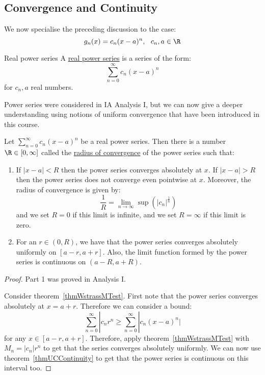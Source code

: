 \documentclass[../Main.tex]{subfiles}
\begin{document}
\subsection{Convergence and Continuity}
We now specialise the preceding discussion to the case:
\begin{equation*}
    g_n(x) = c_n (x - a)^n,~~ c_n, a \in \R
\end{equation*}
\begin{definition}{Real power series}
    A \underline{real power series} is a series of the form:
    \begin{equation*}
        \sum_{n=0}^{\infty} c_n (x-a)^n
    \end{equation*}
    for $c_n, a$ real numbers.
\end{definition}
Power series were considered in IA Analysis I, but we can now give a deeper understanding using notions of uniform convergence that have been introduced in this course.
\begin{theorem}
    Let $\sum_{n = 0}^\infty c_n (x-a)^n$ be a real power series. Then there is a number $\R \in [0, \infty]$ called the \underline{radius of convergence} of the power series such that:
    \begin{enumerate}
        \item If $|x-a| < R$ then the power series converges absolutely at $x$. If $|x-a| > R$ then the power series does not converge even pointwise at $x$.
            Moreover, the radius of convergence is given by:
            \begin{equation*}
                \frac{1}{R} = \lim_{n \to\infty} \sup(|c_n|^\frac{1}{n})
            \end{equation*}
            and we set $R = 0$ if this limit is infinite, and we set $R = \infty$ if this limit is zero.
            \item For an $r \in (0, R)$, we have that the power series converges absolutely uniformly on $[a-r,a+r]$. Also, the limit function formed by the power series is continuous on $(a-R, a+R)$.
    \end{enumerate} 
    \label{thmRadiusConvergence}
\end{theorem}
\begin{proof}
    Part 1 was proved in Analysis I.

    Consider theorem~\ref{thmWstrassMTest}. First note that the power series converges absolutely at $x = a + r$. Therefore we can consider a bound:
    \begin{equation*}
        \sum_{n = 0}^\infty |c_n r^n \geq \sum_{n = 0}^\infty |c_n (x - a)^n|
    \end{equation*}
    for any $x \in [a-r, a+r]$. Therefore, apply theorem~\ref{thmWstrassMTest} with $M_n = |c_n|r^n$ to get that the series converges absolutely uniformly. We can now use theorem~\ref{thmUCContinuity} to get that the power series is continuous on this interval too.
\end{proof}
\end{document}
